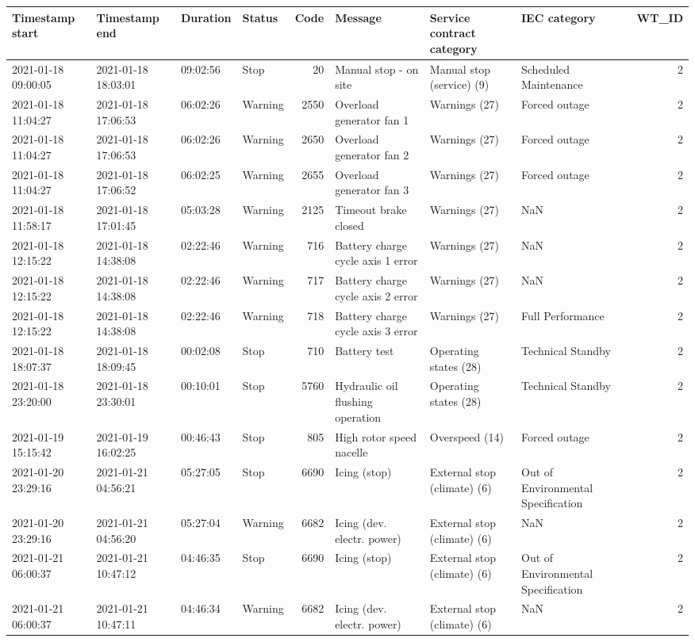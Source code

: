 \begin{tabular}{llllrlllr}
\toprule
Timestamp start & Timestamp end & Duration & Status & Code & Message & Service contract category & IEC category & WT\_ID \\
\midrule
2021-01-18 09:00:05 & 2021-01-18 18:03:01 & 09:02:56 & Stop & 20 & Manual stop - on site & Manual stop (service)  (9) & Scheduled Maintenance & 2 \\
2021-01-18 11:04:27 & 2021-01-18 17:06:53 & 06:02:26 & Warning & 2550 & Overload generator fan 1 & Warnings (27) & Forced outage & 2 \\
2021-01-18 11:04:27 & 2021-01-18 17:06:53 & 06:02:26 & Warning & 2650 & Overload generator fan 2 & Warnings (27) & Forced outage & 2 \\
2021-01-18 11:04:27 & 2021-01-18 17:06:52 & 06:02:25 & Warning & 2655 & Overload generator fan 3 & Warnings (27) & Forced outage & 2 \\
2021-01-18 11:58:17 & 2021-01-18 17:01:45 & 05:03:28 & Warning & 2125 & Timeout brake closed & Warnings (27) & NaN & 2 \\
2021-01-18 12:15:22 & 2021-01-18 14:38:08 & 02:22:46 & Warning & 716 & Battery charge cycle axis 1 error & Warnings (27) & NaN & 2 \\
2021-01-18 12:15:22 & 2021-01-18 14:38:08 & 02:22:46 & Warning & 717 & Battery charge cycle axis 2 error & Warnings (27) & NaN & 2 \\
2021-01-18 12:15:22 & 2021-01-18 14:38:08 & 02:22:46 & Warning & 718 & Battery charge cycle axis 3 error & Warnings (27) & Full Performance & 2 \\
2021-01-18 18:07:37 & 2021-01-18 18:09:45 & 00:02:08 & Stop & 710 & Battery test & Operating states  (28) & Technical Standby & 2 \\
2021-01-18 23:20:00 & 2021-01-18 23:30:01 & 00:10:01 & Stop & 5760 & Hydraulic oil flushing operation & Operating states  (28) & Technical Standby & 2 \\
2021-01-19 15:15:42 & 2021-01-19 16:02:25 & 00:46:43 & Stop & 805 & High rotor speed nacelle & Overspeed (14) & Forced outage & 2 \\
2021-01-20 23:29:16 & 2021-01-21 04:56:21 & 05:27:05 & Stop & 6690 & Icing (stop) & External stop (climate) (6) & Out of Environmental Specification & 2 \\
2021-01-20 23:29:16 & 2021-01-21 04:56:20 & 05:27:04 & Warning & 6682 & Icing (dev. electr. power) & External stop (climate) (6) & NaN & 2 \\
2021-01-21 06:00:37 & 2021-01-21 10:47:12 & 04:46:35 & Stop & 6690 & Icing (stop) & External stop (climate) (6) & Out of Environmental Specification & 2 \\
2021-01-21 06:00:37 & 2021-01-21 10:47:11 & 04:46:34 & Warning & 6682 & Icing (dev. electr. power) & External stop (climate) (6) & NaN & 2 \\
\bottomrule
\end{tabular}
